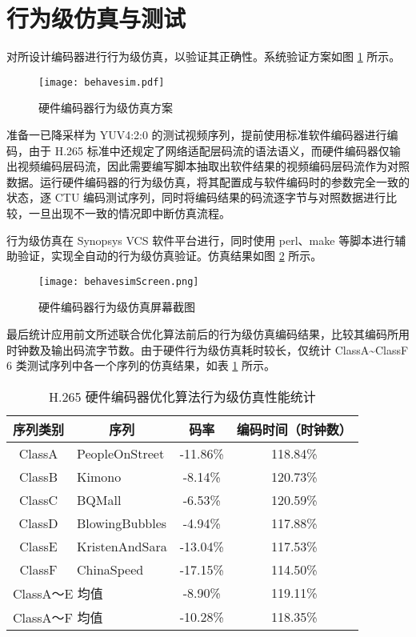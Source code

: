 \section{行为级仿真与测试}
对所设计编码器进行行为级仿真，以验证其正确性。系统验证方案如图 \ref{fig:behavesim} 所示。
\begin{figure}[hbt]
    \centering
    \texttt{[image: behavesim.pdf]}
    \caption{硬件编码器行为级仿真方案}
    \label{fig:behavesim}
\end{figure}
准备一已降采样为 YUV4:2:0 的测试视频序列，提前使用标准软件编码器进行编码，由于 H.265 标准中还规定了网络适配层码流的语法语义，而硬件编码器仅输出视频编码层码流，因此需要编写脚本抽取出软件结果的视频编码层码流作为对照数据。运行硬件编码器的行为级仿真，将其配置成与软件编码时的参数完全一致的状态，逐 CTU 编码测试序列，同时将编码结果的码流逐字节与对照数据进行比较，一旦出现不一致的情况即中断仿真流程。

行为级仿真在 Synopsys VCS 软件平台进行，同时使用 perl、make 等脚本进行辅助验证，实现全自动的行为级仿真验证。仿真结果如图 \ref{fig:behavesimScreen} 所示。
\begin{figure}[hbt]
    \centering
    \texttt{[image: behavesimScreen.png]}
    \caption{硬件编码器行为级仿真屏幕截图}
    \label{fig:behavesimScreen}
\end{figure}

最后统计应用前文所述联合优化算法前后的行为级仿真编码结果，比较其编码所用时钟数及输出码流字节数。由于硬件行为级仿真耗时较长，仅统计 ClassA\textasciitilde ClassF 6 类测试序列中各一个序列的仿真结果，如表 \ref{tab:behavesimTab} 所示。
\begin{table}[hbt]
    \centering
    \caption{H.265 硬件编码器优化算法行为级仿真性能统计}
    \label{tab:behavesimTab}
    \begin{tabular}{@{}clcc@{}}
        \toprule
        序列类别                           & \multicolumn{1}{c}{序列} & 码率     & 编码时间（时钟数） \\ \midrule
        ClassA                             & PeopleOnStreet           & -11.86\% & 118.84\%           \\
        ClassB                             & Kimono                   & -8.14\%  & 120.73\%           \\
        ClassC                             & BQMall                   & -6.53\%  & 120.59\%           \\
        ClassD                             & BlowingBubbles           & -4.94\%  & 117.88\%           \\
        ClassE                             & KristenAndSara           & -13.04\% & 117.53\%           \\
        ClassF                             & ChinaSpeed               & -17.15\% & 114.50\%           \\ \midrule
        \multicolumn{2}{l}{ClassA～E 均值} & -8.90\%                  & 119.11\%                      \\ \midrule
        \multicolumn{2}{l}{ClassA～F 均值} & -10.28\%                 & 118.35\%                      \\ \bottomrule
    \end{tabular}
\end{table}

